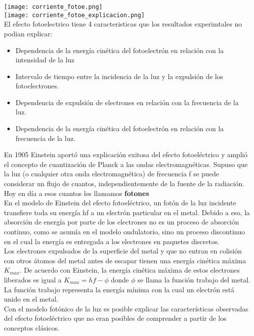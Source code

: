 \documentclass[10pt]{article}
\begin{document}
\texttt{[image: corriente\_fotoe.png]}\\

\texttt{[image: corriente\_fotoe\_explicacion.png]}\\

El efecto fotoelectrico tiene 4 caracteristicas que los resultados experimtales no podian explicar:
\begin{itemize}
	\item Dependencia de la energía cinética del fotoelectrón en relación con la intensidad de la luz
	\item Intervalo de tiempo entre la incidencia de la luz y la expulsión de los fotoelectrones.
	\item Dependencia de expulsión de electrones en relación con la frecuencia de la luz.
	\item Dependencia de la energía cinética del fotoelectrón en relación con la frecuencia de la luz.
\end{itemize}

En 1905 Einstein aportó una explicación exitosa del efecto fotoeléctrico y amplió el concepto de cuantización de Planck a las ondas electromagnéticas. Supuso que la luz (o cualquier otra onda electromagnética) de frecuencia ƒ se puede considerar un flujo de cuantos, independientemente de la fuente de la radiación. Hoy en día a esos cuantos les llamamos \textbf{fotones}\\

En el modelo de Einstein del efecto fotoeléctrico, un fotón de la luz incidente transfiere toda su energía hƒ a un electrón particular en el metal. Debido a eso, la absorción de energía por parte de los electrones no es un proceso de absorción continuo, como se asumía en el modelo ondulatorio, sino un proceso discontinuo en el cual la energía es entregada a los electrones en paquetes discretos.\\
Los electrones expulsados de la superficie del metal y que no entran en colisión con otros átomos del metal antes de escapar tienen una energía cinética máxima $K_{max}$. De acuerdo con Einstein, la energía cinética máxima de estos electrones liberados es igual a $K_{max} = hf- \phi$ donde $\phi$  se llama la función trabajo del metal. La función trabajo representa la energía mínima con la cual un electrón está unido en el metal.\\
Con el modelo fotónico de la luz es posible explicar las características observadas del efecto fotoeléctrico que no eran posibles de comprender a partir de los conceptos clásicos.\\
\end{document}
